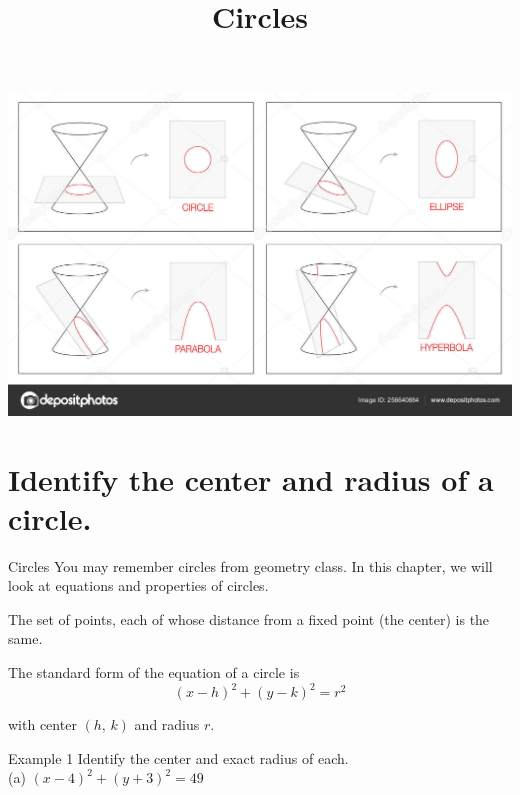 \documentclass[t]{beamer}
\title{Circles}
\author{}
\date{}
\begin{document}
\begin{frame} 
\maketitle
\end{frame}

\begin{frame}[c]
\includegraphics[scale=0.80]{Images/conics.jpg}
\end{frame}

\section{Identify the center and radius of a circle.}

\begin{frame}{Circles}
You may remember circles from geometry class. In this chapter, we will look at equations and properties of circles. \newline\\	\pause

\begin{tcolorbox}[colback=red!10!white, colframe=red!60!black,, title=\textbf{Circles}]
The set of points, each of whose distance from a fixed point (the center) is the same.
\end{tcolorbox}
\vspace{11pt}	\pause

The standard form of the equation of a circle is 
\[
(x-h)^2+(y-k)^2 = r^2
\]

with center $(h, \, k)$ and radius $r$. 
\end{frame}

\begin{frame}{Example 1}
Identify the center and exact radius of each.	\newline\\
(a)	\quad	$(x-4)^2 + (y+3)^2 = 49$	\newline\\
	\newline\\
	
\end{frame}
\end{document}
